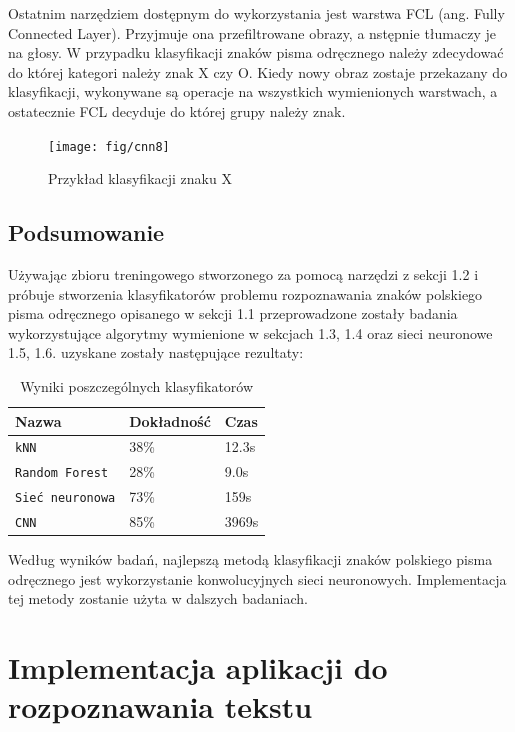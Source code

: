 \documentclass[brudnopis]{xmgr}
\begin{document}
Ostatnim narzędziem dostępnym do wykorzystania jest warstwa FCL (ang. Fully Connected Layer). Przyjmuje ona przefiltrowane obrazy, a nstępnie tłumaczy je na głosy. W przypadku klasyfikacji znaków pisma odręcznego należy zdecydować do której kategori należy znak X czy O. Kiedy nowy obraz zostaje przekazany do klasyfikacji, wykonywane są operacje na wszystkich wymienionych warstwach, a ostatecznie FCL decyduje do której grupy należy znak.

\begin{figure}[!tbh]
\centering
\texttt{[image: fig/cnn8]}
\caption{Przykład klasyfikacji znaku X}
\end{figure}
\clearpage

\section{Podsumowanie}

Używając zbioru treningowego stworzonego za pomocą narzędzi z sekcji 1.2 i próbuje stworzenia klasyfikatorów problemu rozpoznawania znaków polskiego pisma odręcznego opisanego w sekcji 1.1 przeprowadzone zostały badania wykorzystujące algorytmy wymienione w sekcjach 1.3, 1.4 oraz sieci neuronowe 1.5, 1.6. uzyskane zostały następujące rezultaty:

\begin{table}[!htb]
\begin{tabular}{|l|l|l|} \hline
Nazwa & Dokładność      & Czas \\ \hline
\texttt{kNN} & 38\% & 12.3s \\ \hline
\texttt{Random Forest}        & 28\% & 9.0s \\ \hline
\texttt{Sieć neuronowa}     & 73\% & 159s \\ \hline
\texttt{CNN}     & 85\% &  3969s \\ \hline
\end{tabular}
\caption{Wyniki poszczególnych klasyfikatorów}
\end{table}

Według wyników badań, najlepszą metodą klasyfikacji znaków polskiego pisma odręcznego jest wykorzystanie konwolucyjnych sieci neuronowych. Implementacja tej metody zostanie użyta w dalszych badaniach.

\chapter{Implementacja aplikacji do rozpoznawania tekstu}
\end{document}
